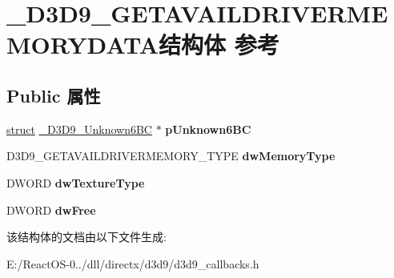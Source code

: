 \hypertarget{struct___d3_d9___g_e_t_a_v_a_i_l_d_r_i_v_e_r_m_e_m_o_r_y_d_a_t_a}{}\section{\+\_\+\+D3\+D9\+\_\+\+G\+E\+T\+A\+V\+A\+I\+L\+D\+R\+I\+V\+E\+R\+M\+E\+M\+O\+R\+Y\+D\+A\+T\+A结构体 参考}
\label{struct___d3_d9___g_e_t_a_v_a_i_l_d_r_i_v_e_r_m_e_m_o_r_y_d_a_t_a}
\subsection*{Public 属性}
\begin{DoxyCompactItemize}
\item 
\mbox{\label{struct___d3_d9___g_e_t_a_v_a_i_l_d_r_i_v_e_r_m_e_m_o_r_y_d_a_t_a_ae5cc65b92ad9b56005748a7cd5ee1cc9}} 
\hyperlink{interfacestruct}{struct} \hyperlink{struct___d3_d9___unknown6_b_c}{\+\_\+\+D3\+D9\+\_\+\+Unknown6\+BC} $\ast$ {\bfseries p\+Unknown6\+BC}
\item 
\mbox{\label{struct___d3_d9___g_e_t_a_v_a_i_l_d_r_i_v_e_r_m_e_m_o_r_y_d_a_t_a_a7b1b0cb4d082f98aae9664cab592394a}} 
D3\+D9\+\_\+\+G\+E\+T\+A\+V\+A\+I\+L\+D\+R\+I\+V\+E\+R\+M\+E\+M\+O\+R\+Y\+\_\+\+T\+Y\+PE {\bfseries dw\+Memory\+Type}
\item 
\mbox{\label{struct___d3_d9___g_e_t_a_v_a_i_l_d_r_i_v_e_r_m_e_m_o_r_y_d_a_t_a_a907ce3619b854c80f5f785230d9de7aa}} 
D\+W\+O\+RD {\bfseries dw\+Texture\+Type}
\item 
\mbox{\label{struct___d3_d9___g_e_t_a_v_a_i_l_d_r_i_v_e_r_m_e_m_o_r_y_d_a_t_a_ad5b313981cd96ecff7b6941c3cc07a52}} 
D\+W\+O\+RD {\bfseries dw\+Free}
\end{DoxyCompactItemize}


该结构体的文档由以下文件生成\+:\begin{DoxyCompactItemize}
\item 
E\+:/\+React\+O\+S-\/0../dll/directx/d3d9/d3d9\+\_\+callbacks.\+h\end{DoxyCompactItemize}
